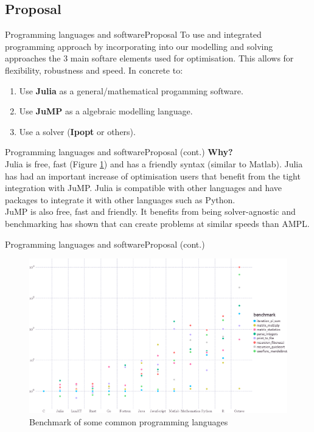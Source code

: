 \documentclass[handout]{beamer}
\begin{document}
\subsection{Proposal}
\begin{frame}[t]{Programming languages and software}{Proposal}
  To use and integrated programming approach by incorporating into our modelling and solving approaches the 3 main softare elements used for optimisation. This allows for flexibility, robustness and speed. In concrete to:\\[12pt]
\begin{enumerate}
  \item Use \textbf{Julia} as a general/mathematical progamming software.
  \item Use \textbf{JuMP} as a algebraic modelling language.
  \item Use a solver (\textbf{Ipopt} or others).
\end{enumerate}
\end{frame}

\begin{frame}[t]{Programming languages and software}{Proposal (cont.)}
  \textbf{Why?}\\[12pt]
  Julia is free, fast (Figure \ref{fig:speed}) and has a friendly syntax (similar to Matlab). Julia has had an important increase of optimisation users that benefit from the tight integration with JuMP. Julia is compatible with other languages and have packages to integrate it with other languages such as Python.\\[6pt]

  JuMP is also free, fast and friendly. It benefits from being solver-agnostic and benchmarking has shown that can create problems at similar speeds than AMPL.
\end{frame}

\begin{frame}[t]{Programming languages and software}{Proposal (cont.)}
  \begin{figure}
  \begin{center}
  \includegraphics[width=\textwidth]{benchmarks.eps}
  \end{center}
  \caption{Benchmark of some common programming languages}\label{fig:speed}
  \end{figure}

\end{frame}
\end{document}

